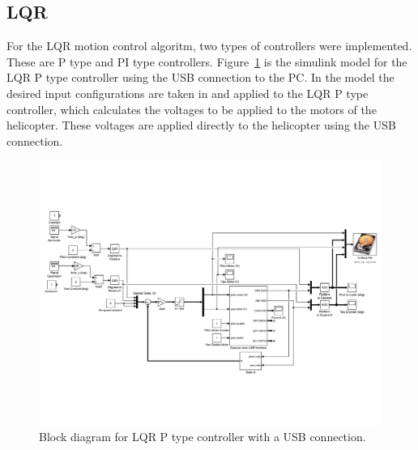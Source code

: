 \subsection{LQR}
For the LQR motion control algoritm, two types of controllers were implemented.  These are P type and PI type controllers.  Figure~\ref{fig:LQR_P_USB_Block_Diagram} is the simulink model for the LQR P type controller using the USB connection to the PC.  In the model the desired input configurations are taken in and applied to the LQR P type controller, which calculates the voltages to be applied to the motors of the helicopter.  These voltages are applied directly to the helicopter using the USB connection.
\begin{figure}[!htbp]
    \centering
    \includegraphics[width=.8\textwidth,keepaspectratio=true]{figs/img/LQR_USB}
    \caption{Block diagram for LQR P type controller with a USB connection.}
    \label{fig:LQR_P_USB_Block_Diagram}
\end{figure}

